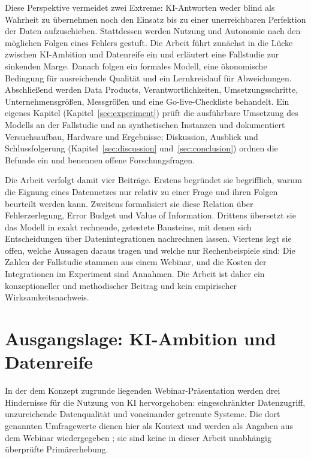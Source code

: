 \documentclass[a4paper,12pt,twoside]{report}
\theoremstyle{definition}
\begin{document}
Diese Perspektive vermeidet zwei Extreme: KI-Antworten weder blind als Wahrheit zu übernehmen noch den Einsatz bis zu einer unerreichbaren Perfektion der Daten aufzuschieben. Stattdessen werden Nutzung und Autonomie nach den möglichen Folgen eines Fehlers gestuft. Die Arbeit führt zunächst in die Lücke zwischen KI-Ambition und Datenreife ein und erläutert eine Fallstudie zur sinkenden Marge. Danach folgen ein formales Modell, eine ökonomische Bedingung für ausreichende Qualität und ein Lernkreislauf für Abweichungen. Abschließend werden Data Products, Verantwortlichkeiten, Umsetzungsschritte, Unternehmensgrößen, Messgrößen und eine Go-live-Checkliste behandelt. Ein eigenes Kapitel (Kapitel~\ref{sec:experiment}) prüft die ausführbare Umsetzung des Modells an der Fallstudie und an synthetischen Instanzen und dokumentiert Versuchsaufbau, Hardware und Ergebnisse; Diskussion, Ausblick und Schlussfolgerung (Kapitel~\ref{sec:discussion} und~\ref{sec:conclusion}) ordnen die Befunde ein und benennen offene Forschungsfragen.

Die Arbeit verfolgt damit vier Beiträge. Erstens begründet sie begrifflich, warum die Eignung eines Datennetzes nur relativ zu einer Frage und ihren Folgen beurteilt werden kann. Zweitens formalisiert sie diese Relation über Fehlerzerlegung, Error Budget und Value of Information. Drittens übersetzt sie das Modell in exakt rechnende, getestete Bausteine, mit denen sich Entscheidungen über Datenintegrationen nachrechnen lassen. Viertens legt sie offen, welche Aussagen daraus tragen und welche nur Rechenbeispiele sind: Die Zahlen der Fallstudie stammen aus einem Webinar, und die Kosten der Integrationen im Experiment sind Annahmen. Die Arbeit ist daher ein konzeptioneller und methodischer Beitrag und kein empirischer Wirksamkeitsnachweis.

\chapter{Ausgangslage: KI-Ambition und Datenreife}
\label{sec:starting-point}

In der dem Konzept zugrunde liegenden Webinar-Präsentation werden drei Hindernisse für die Nutzung von KI hervorgehoben: eingeschränkter Datenzugriff, unzureichende Datenqualität und voneinander getrennte Systeme. Die dort genannten Umfragewerte dienen hier als Kontext und werden als Angaben aus dem Webinar wiedergegeben \cite{webinar2026}; sie sind keine in dieser Arbeit unabhängig überprüfte Primärerhebung.
\end{document}
